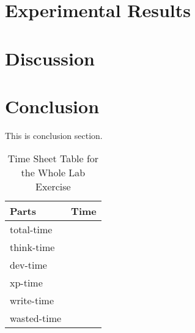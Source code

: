 \documentclass[10pt, a4paper, twoside, twocolumn, technote]{IEEEtran}
\begin{document}
\section{Experimental Results}\label{experiment}


\section{Discussion}\label{discussion}


\section{Conclusion}\label{conclusion}
This is conclusion section.

\begin{table}
  \caption{Time Sheet Table for the Whole Lab Exercise}
  \centering
  \begin{tabular}{l|l}
    \hline
    Parts       & Time \\
    \hline
    total-time  & \\
    think-time  & \\
    dev-time    & \\
    xp-time     & \\
    write-time  & \\
    wasted-time & \\
    \hline
  \end{tabular}
\end{table}



\end{document}
